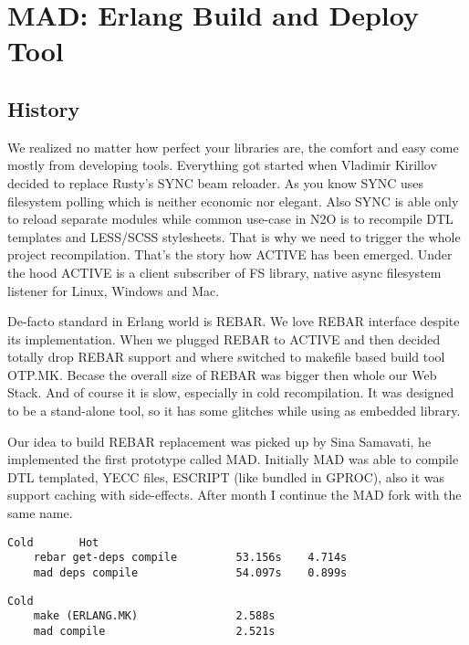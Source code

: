 \section{MAD: Erlang Build and Deploy Tool}

\subsection{History}

We realized no matter how perfect your libraries are,
the comfort and easy come mostly from developing tools.
Everything got started when Vladimir Kirillov decided to
replace Rusty's SYNC beam reloader. As you know SYNC uses
filesystem polling which is neither economic nor elegant. Also
SYNC is able only to reload separate modules while
common use-case in N2O is to recompile DTL templates
and LESS/SCSS stylesheets. That is why we need to trigger
the whole project recompilation. That's the story how ACTIVE
has been emerged. Under the hood ACTIVE is a client subscriber
of FS library, native async filesystem listener
for Linux, Windows and Mac.

De-facto standard in Erlang world is REBAR.
We love REBAR interface despite its implementation.
When we plugged REBAR to ACTIVE and then decided totally
drop REBAR support and where switched to makefile
based build tool OTP.MK. Becase the overall size
of REBAR was bigger then whole our Web Stack.
And of course it is slow, especially in cold recompilation.
It was designed to be a stand-alone tool, so it has some
glitches while using as embedded library.

Our idea to build REBAR replacement was picked up by Sina Samavati,
he implemented the first prototype called MAD. Initially MAD
was able to compile DTL templated, YECC files, ESCRIPT (like
bundled in GPROC), also it was support caching with side-effects.
After month I continue the MAD fork with the same name.

\vspace{1\baselineskip}
\begin{lstlisting}[caption=Example of building N2O sample]
                                   Cold       Hot
    rebar get-deps compile         53.156s    4.714s
    mad deps compile               54.097s    0.899s
\end{lstlisting}
\vspace{1\baselineskip}

\vspace{1\baselineskip}
\begin{lstlisting}[caption=Example of building Cowboy]
                                   Cold
    make (ERLANG.MK)               2.588s
    mad compile                    2.521s
\end{lstlisting}
\vspace{1\baselineskip}

